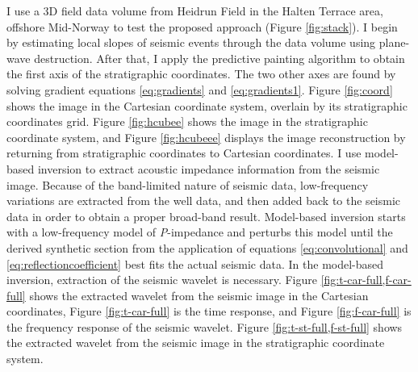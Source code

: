 I use a 3D field data volume from Heidrun Field in the Halten Terrace area, offshore Mid-Norway \cite[]{moscardelli} to test the proposed approach (Figure \ref{fig:stack}). I begin by estimating local slopes of seismic events through the data volume using plane-wave destruction. After that, I apply the predictive painting algorithm to obtain the first axis of the stratigraphic coordinates. The two other axes are found by solving gradient equations \ref{eq:gradients} and \ref{eq:gradients1}. Figure \ref{fig:coord} shows the image in the Cartesian coordinate system, overlain by its stratigraphic coordinates grid. Figure \ref{fig:hcubee} shows the image in the stratigraphic coordinate system, and Figure \ref{fig:hcubeee} displays the image reconstruction by returning from stratigraphic coordinates to Cartesian coordinates. I use model-based inversion \cite[]{russel1991,cooke1983} to extract acoustic impedance information from the seismic image. Because of the band-limited nature of seismic data, low-frequency variations are extracted from the well data, and then added back to the seismic data in order to obtain a proper broad-band result. Model-based inversion starts with a low-frequency model of \emph{P}-impedance and perturbs this model until the derived synthetic section from the application of equations \ref{eq:convolutional} and \ref{eq:reflectioncoefficient} best fits the actual seismic data. In the model-based inversion, extraction of the seismic wavelet is necessary. Figure \ref{fig:t-car-full,f-car-full} shows the extracted wavelet from the seismic image in the Cartesian coordinates, Figure \ref{fig:t-car-full} is the time response, and Figure \ref{fig:f-car-full} is the frequency response of the seismic wavelet. Figure \ref{fig:t-st-full,f-st-full} shows the extracted wavelet from the seismic image in the stratigraphic coordinate system. 

